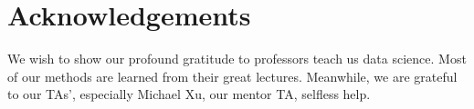 \section{Acknowledgements}\label{ack}

We wish to show our profound gratitude to professors teach us data science. Most of our methods are learned from their great lectures. Meanwhile, we are grateful to our TAs', especially Michael Xu, our mentor TA, selfless help.